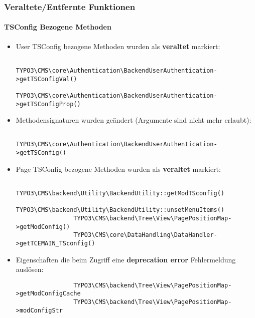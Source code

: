 
\begin{frame}[fragile]
	\frametitle{Veraltete/Entfernte Funktionen}
	\framesubtitle{TSConfig Bezogene Methoden}

	\lstset{basicstyle=\tiny\ttfamily}

	\begin{itemize}
		\item User TSConfig bezogene Methoden wurden als \textbf{veraltet} markiert:

			\begin{lstlisting}
				TYPO3\CMS\core\Authentication\BackendUserAuthentication->getTSConfigVal()
				TYPO3\CMS\core\Authentication\BackendUserAuthentication->getTSConfigProp()
			\end{lstlisting}

		\item Methodensignaturen wurden geändert (Argumente sind nicht mehr erlaubt):

			\begin{lstlisting}
				TYPO3\CMS\core\Authentication\BackendUserAuthentication->getTSConfig()
			\end{lstlisting}

		\item Page TSConfig bezogene Methoden wurden als \textbf{veraltet} markiert:

			\begin{lstlisting}
				TYPO3\CMS\backend\Utility\BackendUtility::getModTSconfig()
				TYPO3\CMS\backend\Utility\BackendUtility::unsetMenuItems()
				TYPO3\CMS\backend\Tree\View\PagePositionMap->getModConfig()
				TYPO3\CMS\core\DataHandling\DataHandler->getTCEMAIN_TSconfig()
			\end{lstlisting}

		\item Eigenschaften die beim Zugriff eine \textbf{deprecation error} Fehlermeldung auslösen:

			\begin{lstlisting}
				TYPO3\CMS\backend\Tree\View\PagePositionMap->getModConfigCache
				TYPO3\CMS\backend\Tree\View\PagePositionMap->modConfigStr
			\end{lstlisting}

	\end{itemize}

\end{frame}


